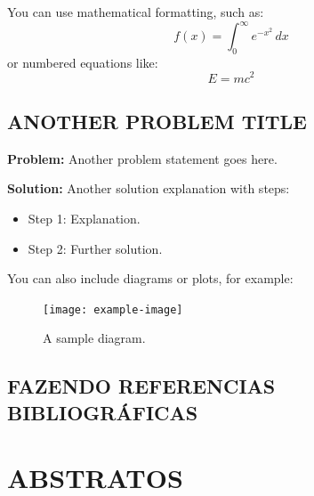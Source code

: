 You can use mathematical formatting, such as:
\[
f(x) = \int_{0}^{\infty} e^{-x^2} \, dx
\]
or numbered equations like:
\begin{equation}
    E = mc^2
\end{equation}

\newpage

\subsection{ANOTHER PROBLEM TITLE}
\textbf{Problem:} Another problem statement goes here.

\vspace{1em}

\textbf{Solution:} Another solution explanation with steps:
\begin{itemize}
    \item Step 1: Explanation.
    \item Step 2: Further solution.
\end{itemize}

You can also include diagrams or plots, for example:
\begin{figure}[h]
    \centering
    \texttt{[image: example-image]} %
    \caption{A sample diagram.}
    \label{fig:sample-diagram}
\end{figure}

\newpage

\subsection{FAZENDO REFERENCIAS BIBLIOGRÁFICAS}



\lipsum[3]

\section*{ABSTRATOS}

\lipsum[3]

\newpage